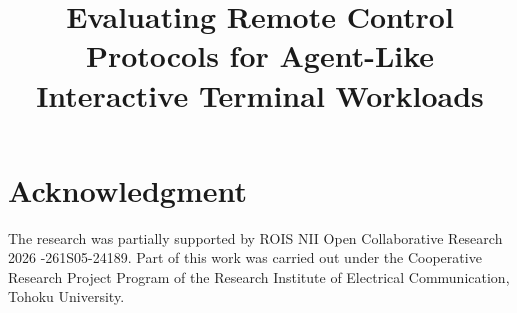 \documentclass[conference]{IEEEtran}
\begin{document}


\newcommand{\thanhnt}[1] { {\color{blue}{#1}}}

\title{Evaluating Remote Control Protocols for Agent-Like Interactive Terminal Workloads}

\author{
}

\maketitle
\thispagestyle{plain}
\pagestyle{plain}









\section*{Acknowledgment}
The research was partially supported by ROIS NII Open Collaborative Research 2026 -261S05-24189. Part of this work was carried out under the Cooperative Research Project Program of the Research Institute of Electrical Communication, Tohoku University.

%

{}
\end{document}
